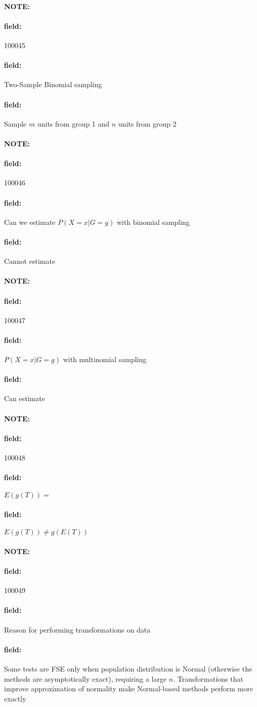 \documentclass[12pt]{article}
\newenvironment{note}{\paragraph{NOTE:}}{}
\newenvironment{field}{\paragraph{field:}}{}
\begin{document}
\begin{note} \begin{field} \tiny 100045 \end{field}
 \begin{field}
  Two-Sample Binomial sampling
 \end{field}
 \begin{field}
  Sample $m$ units from group 1 and $n $ units from group 2
 \end{field}
\end{note}


\begin{note} \begin{field} \tiny 100046 \end{field}
 \begin{field}
  Can we estimate $P(X = x | G = g)$ with binomial sampling
 \end{field}
 \begin{field}
  Cannot estimate
 \end{field}
\end{note}

\begin{note} \begin{field} \tiny 100047 \end{field}
 \begin{field}
  $P(X = x | G = g)$ with multinomial sampling
 \end{field}
 \begin{field}
  Can estimate
 \end{field}
\end{note}

\begin{note} \begin{field} \tiny 100048 \end{field}
 \begin{field}
  $E(g(T)) = $
 \end{field}
 \begin{field}
  $E(g(T)) \neq g(E(T))$
 \end{field}
\end{note}


\begin{note} \begin{field} \tiny 100049 \end{field}
 \begin{field}
  Reason for performing transformations on data
 \end{field}
 \begin{field}
  Some tests are FSE only when population distribution is Normal (otherwise the methods are asymptotically exact), requiring a large $n$. Transformations that improve approximation of normality make Normal-based methods perform more exactly
 \end{field}
\end{note}
\end{document}
